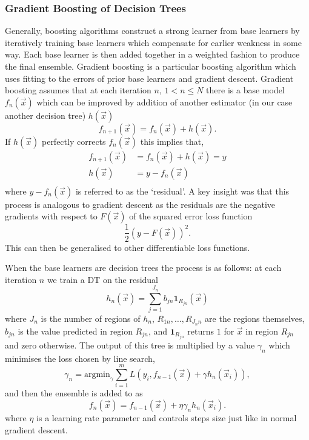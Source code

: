 \subsubsection{Gradient Boosting of Decision Trees}
Generally, boosting algorithms \cite{Boosting} construct a strong learner from base learners by iteratively training base learners which compensate for earlier weakness in some way. Each base learner is then added together in a weighted fashion to produce the final ensemble.
Gradient boosting \cite{GradientBoosting} is a particular boosting algorithm which uses fitting to the errors of prior base learners and gradient descent. Gradient boosting assumes that at each iteration $n$, $1<n\leq{N}$ there is a base model $f_{n}(\vec{x})$ which can be improved by addition of another estimator (in our case another decision tree) $h(\vec{x})$
\begin{equation}
    f_{n+1}(\vec{x}) = f_{n}(\vec{x}) + h(\vec{x}).
\end{equation}
If $h(\vec{x})$ perfectly corrects $f_{n}(\vec{x})$ this implies that,
\begin{equation}
    \begin{split}
        f_{n+1}(\vec{x}) &= f_{n}(\vec{x}) + h(\vec{x}) = y \\
        h(\vec{x}) &= y - f_{n}(\vec{x}) \\
    \end{split}
\end{equation}
where $y - f_{n}(\vec{x})$ is referred to as the `residual'. A key insight was that this process is analogous to gradient descent as the residuals are the negative gradients with respect to $F(\vec{x})$ of the squared error loss function
\begin{equation}
    \frac{1}{2}(y-F(\vec{x}))^{2}.
\end{equation}
This can then be generalised to other differentiable loss functions. 

When the base learners are decision trees the process is as follows: at each iteration $n$ we train a DT on the residual 
\begin{equation}
    h_{n}(\vec{x}) = \sum_{j=1}^{J_{n}}b_{jn}\mathbf{1}_{R_{jn}}(\vec{x})
\end{equation}
where $J_n$ is the number of regions of $h_{n}$, $R_{1n},\dots,R_{J_{n}n}$ are the regions themselves, $b_{jn}$ is the value predicted in region $R_{jn}$, and $\mathbf{1}_{R_{jn}}$ returns $1$ for $\vec{x}$ in region $R_{jn}$ and zero otherwise. 
The output of this tree is multiplied by a value $\gamma_{n}$ which minimises the loss chosen by line search,
\begin{equation}
    \gamma_{n} = \mathrm{argmin}_{\gamma}\sum_{i=1}^{m}L(y_{i},f_{n-1}(\vec{x})+\gamma{}h_{n}(\vec{x}_{i})),
\end{equation}
and then the ensemble is added to as
\begin{equation}
    f_{n}(\vec{x}) = f_{n-1}(\vec{x}) +\eta\gamma_{n}h_{n}(\vec{x}_{i}).
\end{equation}
where $\eta$ is a learning rate parameter and controls steps size just like in normal gradient descent. 




